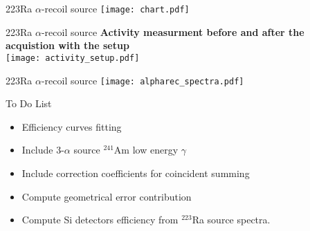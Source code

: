 \documentclass[10pt]{beamer}
\begin{document}
\begin{frame}{223Ra $\alpha$-recoil source}
	\centering
	\texttt{[image: chart.pdf]}
\end{frame}

\begin{frame}{223Ra $\alpha$-recoil source}
	\centering
	\vspace{-0.1\textheight}
	\textbf{Activity measurment before and after the acquistion with the setup}\\
	\texttt{[image: activity\_setup.pdf]}
\end{frame}


\begin{frame}{223Ra $\alpha$-recoil source}
	\centering
	\vspace{-0.1\textheight}
	\texttt{[image: alpharec\_spectra.pdf]}
\end{frame}


\begin{frame}{To Do List}
	\centering
	\begin{itemize}
		\item Efficiency curves fitting
		\item Include 3-$\alpha$ source $^{241}$Am low energy $\gamma$ 
		\item Include correction coefficients for coincident summing
		\item Compute geometrical error contribution
		\item Compute Si detectors efficiency from $^{223}$Ra source spectra.
	\end{itemize}
\end{frame}
\end{document}
